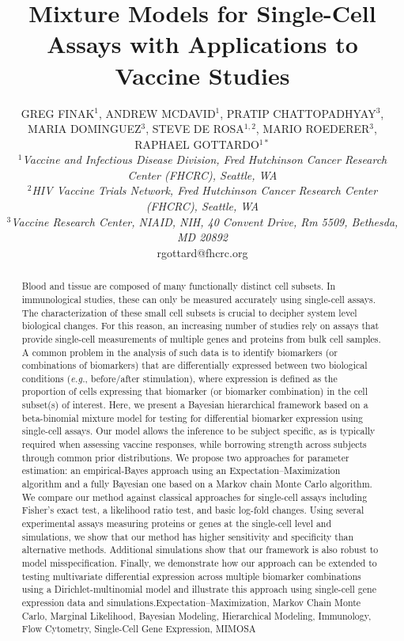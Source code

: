 \documentclass[12pt,oupdraft]{biostatistics}
\title{Mixture Models for Single-Cell Assays with Applications to Vaccine Studies}
\author{GREG FINAK$^{1}$, 
 ANDREW MCDAVID$^{1}$,
 PRATIP CHATTOPADHYAY$^{3}$,
 MARIA DOMINGUEZ$^{3}$,
 STEVE DE ROSA$^{1,2}$,
 MARIO ROEDERER$^{3}$,
 RAPHAEL GOTTARDO$^{1\ast}$
 \\[4pt]
\textit{ $^{1}$Vaccine and Infectious Disease Division, Fred Hutchinson Cancer Research Center (FHCRC), Seattle, WA\\
 $^{2}$HIV Vaccine Trials Network, Fred Hutchinson Cancer Research Center (FHCRC), Seattle, WA\\
 $^{3}$Vaccine Research Center, NIAID, NIH, 40 Convent Drive, Rm 5509, Bethesda, MD 20892}
 \\[2pt]
 {rgottard@fhcrc.org}}
\date{}
\begin{document}




\maketitle
{}

\begin{abstract}
{Blood and tissue are composed of many functionally distinct cell subsets. In immunological studies, these can only be measured accurately using single-cell assays. The characterization of these small cell subsets is crucial to decipher system level biological changes. For this reason, an increasing number of studies rely on assays that provide single-cell measurements of multiple genes and proteins from bulk cell samples. A common problem in the analysis of such data is to identify biomarkers (or combinations of biomarkers) that are differentially expressed between two biological conditions (\textit{e.g.}, before/after stimulation), where expression is defined as the proportion of cells expressing that biomarker (or biomarker combination) in the cell subset(s) of interest.
Here, we present a Bayesian hierarchical framework based on a beta-binomial mixture model for testing for differential biomarker expression using single-cell assays. Our model allows the inference to be subject specific, as is typically required when assessing vaccine responses, while borrowing strength across subjects through common prior distributions. We propose two approaches for parameter estimation: an empirical-Bayes approach using an Expectation--Maximization algorithm and a fully Bayesian one based on a Markov chain Monte Carlo algorithm. We compare our method against classical approaches for single-cell assays including Fisher's exact test, a likelihood ratio test, and basic log-fold changes. Using several experimental assays measuring proteins or genes at the single-cell level and simulations, we show that our method has higher sensitivity and specificity than alternative methods. Additional simulations show that our framework is also robust to model misspecification. Finally, we demonstrate how our approach can be extended to testing multivariate differential expression across multiple biomarker combinations using a Dirichlet-multinomial model and illustrate this approach using single-cell gene expression data and simulations.}{Expectation--Maximization, Markov Chain Monte Carlo,
Marginal Likelihood, Bayesian Modeling, Hierarchical Modeling,
Immunology, Flow Cytometry, Single-Cell Gene Expression, MIMOSA}
\end{abstract}
\end{document}
